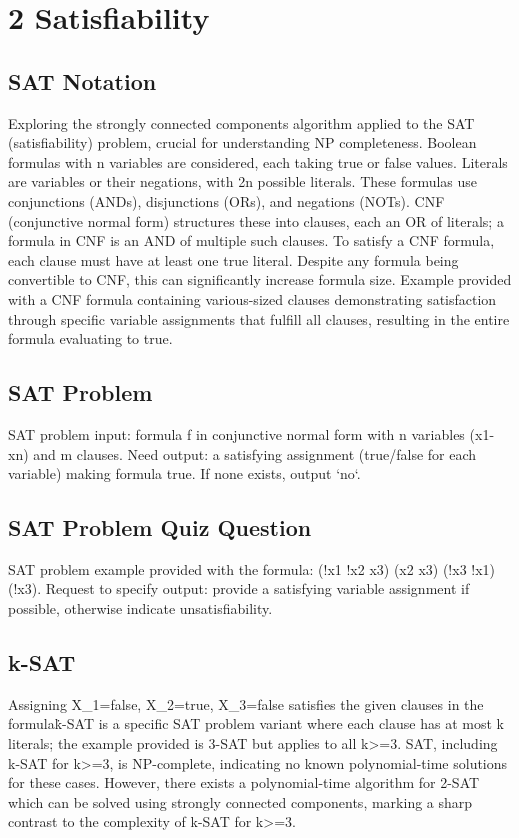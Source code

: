 \section*{2 Satisfiability}

\subsection*{SAT  Notation}
Exploring the strongly connected components algorithm applied to the SAT (satisfiability) problem, crucial for understanding NP completeness.
Boolean formulas with n variables are considered, each taking true or false values.
Literals are variables or their negations, with 2n possible literals.
These formulas use conjunctions (ANDs), disjunctions (ORs), and negations (NOTs).
CNF (conjunctive normal form) structures these into clauses, each an OR of literals; a formula in CNF is an AND of multiple such clauses.
To satisfy a CNF formula, each clause must have at least one true literal.
Despite any formula being convertible to CNF, this can significantly increase formula size.
Example provided with a CNF formula containing various-sized clauses demonstrating satisfaction through specific variable assignments that fulfill all clauses, resulting in the entire formula evaluating to true.

\subsection*{SAT Problem}
SAT problem input: formula f in conjunctive normal form with n variables (x1-xn) and m clauses.
Need output: a satisfying assignment (true/false for each variable) making formula true.
If none exists, output `no`.

\subsection*{SAT Problem Quiz Question}
SAT problem example provided with the formula: (!x1  !x2  x3)  (x2  x3)  (!x3  !x1)  (!x3).
Request to specify output: provide a satisfying variable assignment if possible, otherwise indicate unsatisfiability.

\subsection*{k-SAT}
Assigning X\_1=false, X\_2=true, X\_3=false satisfies the given clauses in the formula\. k-SAT is a specific SAT problem variant where each clause has at most k literals; the example provided is 3-SAT but applies to all k\textgreater{}=3.
SAT, including k-SAT for k\textgreater{}=3, is NP-complete, indicating no known polynomial-time solutions for these cases.
However, there exists a polynomial-time algorithm for 2-SAT which can be solved using strongly connected components, marking a sharp contrast to the complexity of k-SAT for k\textgreater{}=3.


